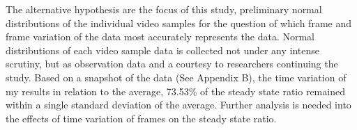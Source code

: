 \indent The alternative hypothesis are the focus of this study, preliminary normal distributions of the individual video samples for the question of which frame and frame variation of the data most accurately represents the data. Normal distributions of each video sample data is collected not under any intense scrutiny, but as observation data and a courtesy to researchers continuing the study. Based on a snapshot of the data (See Appendix B), the time variation of my results in relation to the average, 73.53\% of the steady state ratio remained within a single standard deviation of the average. Further analysis is needed into the effects of time variation of frames on the steady state ratio.                               



